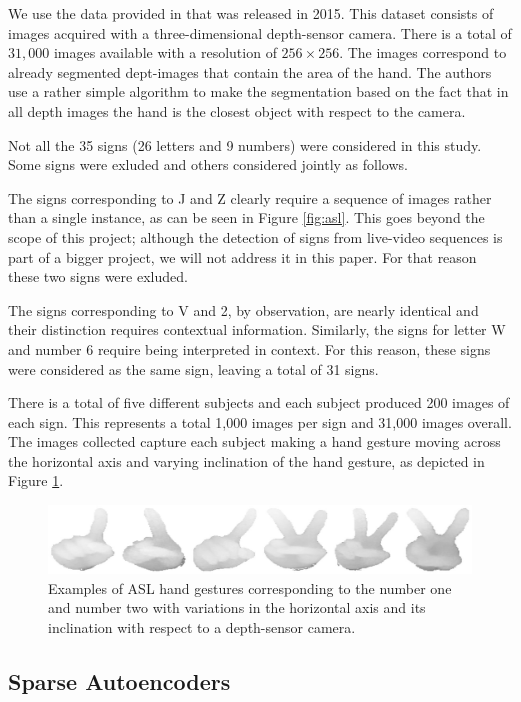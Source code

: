 \documentclass[a4paper]{article}
\begin{document}
We use the data provided in \cite{kang2015real} that was released in 2015. This
dataset consists of images acquired with a three-dimensional depth-sensor camera. 
There is a total of $31,000$ images available with a resolution of $256 \times
256$. The images correspond to already segmented dept-images that contain the
area of the hand. The authors use a rather simple algorithm to make the
segmentation based on the fact that in all depth images the hand is the closest
object with respect to the camera. 

Not all the 35 signs (26 letters and 9 numbers) 
were considered in this study. Some signs
were exluded and others considered jointly as follows.

The signs corresponding to J and Z clearly require a sequence of images rather
than a single instance, as can be seen in Figure \ref{fig:asl}. This goes
beyond the scope of this project; although the detection of signs from
live-video sequences is part of a bigger project, we will not address it in this
paper. For that reason these two signs were exluded.

The signs corresponding to V and 2, by observation, are nearly identical and
their distinction requires contextual information. Similarly, the signs for
letter W and number 6 require being interpreted in context. 
For this reason, these signs were considered as the same sign, leaving a total
of 31 signs.

There is a total of five different 
subjects and each subject produced 200 images of each
sign. This represents a total 1,000 images per sign and 31,000 images overall.
The images collected capture each subject making a hand gesture moving across
the horizontal axis and varying inclination of the hand gesture, as depicted in
Figure \ref{fig:sampN1}.

\begin{figure}
\centering
\includegraphics[width=\textwidth]{img/sampleNum1.eps}
\caption{Examples of ASL hand gestures corresponding to the number one and 
number two with variations in
the horizontal axis and its inclination with respect to a depth-sensor camera.}
\label{fig:sampN1}
\end{figure}


\subsection{Sparse Autoencoders}
\end{document}
